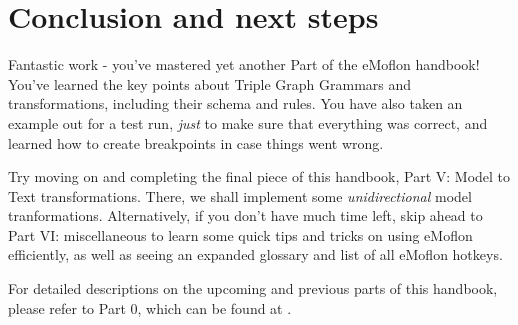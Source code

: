 \section{Conclusion and next steps}
\genHeader

\vspace{0.5cm}

Fantastic work - you've mastered yet another Part of the eMoflon handbook! You've learned the key points about Triple Graph Grammars and transformations,
including their schema and rules. You have also taken an example out for a test run, \emph{just} to make sure that everything was correct, and learned how to
create breakpoints in case things went wrong.

Try moving on and completing the final piece of this handbook, Part V: Model to Text transformations. There, we shall implement some \emph{unidirectional} model
tranformations. Alternatively, if you don't have much time left, skip ahead to Part VI: miscellaneous to learn some quick tips and tricks on using eMoflon
efficiently, as well as seeing an expanded glossary and list of all eMoflon hotkeys.

For detailed descriptions on the upcoming and previous parts of this handbook, please refer to Part 0, which can be found at \dlPartZero.
